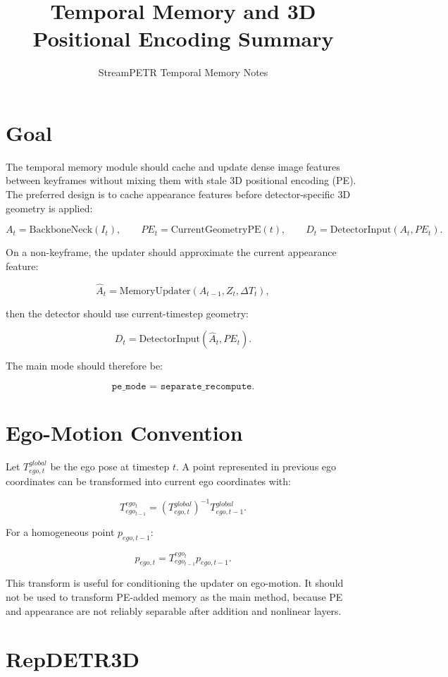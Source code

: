 \documentclass[11pt]{article}
\title{Temporal Memory and 3D Positional Encoding Summary}
\author{StreamPETR Temporal Memory Notes}
\date{}
\begin{document}
\maketitle

\section{Goal}

The temporal memory module should cache and update dense image features between keyframes without mixing them with stale 3D positional encoding (PE). The preferred design is to cache appearance features before detector-specific 3D geometry is applied:

\[
A_t = \text{BackboneNeck}(I_t),
\qquad
PE_t = \text{CurrentGeometryPE}(t),
\qquad
D_t = \text{DetectorInput}(A_t, PE_t).
\]

On a non-keyframe, the updater should approximate the current appearance feature:

\[
\hat{A}_t = \text{MemoryUpdater}(A_{t-1}, Z_t, \Delta T_t),
\]

then the detector should use current-timestep geometry:

\[
D_t = \text{DetectorInput}(\hat{A}_t, PE_t).
\]

The main mode should therefore be:

\[
\texttt{pe\_mode = separate\_recompute}.
\]

\section{Ego-Motion Convention}

Let \(T^{global}_{ego,t}\) be the ego pose at timestep \(t\). A point represented in previous ego coordinates can be transformed into current ego coordinates with:

\[
T^{ego_t}_{ego_{t-1}}
= \left(T^{global}_{ego,t}\right)^{-1} T^{global}_{ego,t-1}.
\]

For a homogeneous point \(p_{ego,t-1}\):

\[
p_{ego,t}
= T^{ego_t}_{ego_{t-1}} p_{ego,t-1}.
\]

This transform is useful for conditioning the updater on ego-motion. It should not be used to transform PE-added memory as the main method, because PE and appearance are not reliably separable after addition and nonlinear layers.

\section{RepDETR3D}
\end{document}

